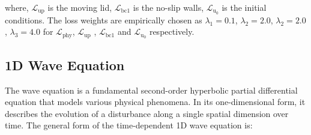 \noindent where, $\mathcal{L}_{\mathrm{up}}$ is the moving lid, $\mathcal{L}_{\mathrm{bc1}}$ is the no-slip walls, $\mathcal{L}_{\mathrm{u_0}}$ is the initial conditions. The loss weights are empirically chosen as $\lambda_1 = 0.1$, $\lambda_2 = 2.0$, $\lambda_2 = 2.0$, $\lambda_3 = 4.0$ for $ \mathcal{L}_{\mathrm{phy}}$,  $\mathcal{L}_{\mathrm{up}}$ , $\mathcal{L}_{\mathrm{bc1}}$ and $\mathcal{L}_{\mathrm{u_0}}$ respectively.











\subsection{1D Wave Equation}
The wave equation is a fundamental second-order hyperbolic partial differential equation that models various physical phenomena. In its one-dimensional form, it describes the evolution of a disturbance along a single spatial dimension over time. The general form of the time-dependent 1D wave equation is:

